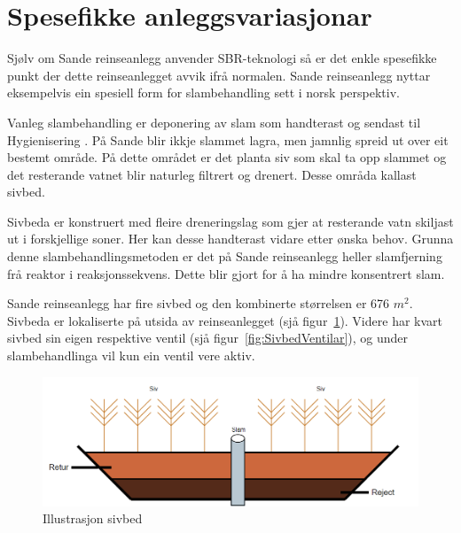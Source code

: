 \newpage
\section{Spesefikke anleggsvariasjonar}
\thispagestyle{fancy}

Sjølv om Sande reinseanlegg anvender \gls{SBR}-teknologi så er det enkle spesefikke
punkt der dette reinseanlegget avvik ifrå normalen. 
Sande reinseanlegg nyttar eksempelvis ein spesiell form for slambehandling sett i norsk perspektiv.

Vanleg slambehandling er deponering av slam som handterast og sendast til \gls{Hygienisering} \citep{Slam}.
På Sande blir ikkje slammet lagra, men jamnlig spreid ut over eit bestemt område. På dette området er
det planta siv som skal ta opp slammet og det resterande vatnet blir naturleg filtrert og drenert.
Desse områda kallast sivbed.

Sivbeda er konstruert med fleire dreneringslag som gjer at resterande vatn skiljast ut i forskjellige soner.
Her kan desse handterast vidare etter ønska behov. 
Grunna denne slambehandlingsmetoden er det på Sande reinseanlegg heller slamfjerning frå reaktor
i reaksjonssekvens. Dette blir gjort for å ha mindre konsentrert slam.

Sande reinseanlegg har fire sivbed og den kombinerte størrelsen er 676 $m^2$. Sivbeda er lokaliserte på utsida av reinseanlegget (sjå figur~\ref{fig:Sivbed}).\newline
Videre har kvart sivbed sin eigen respektive ventil (sjå figur~\ref{fig:SivbedVentilar}), og under slambehandlinga vil kun ein ventil vere aktiv. 
 

\begin{figure}[htbp]
    \centering
    \includegraphics[width=1\textwidth]{Figurar/Sivbed.png}
    \caption{Illustrasjon sivbed}\label{fig:Sivbed}
\end{figure}

\newpage


